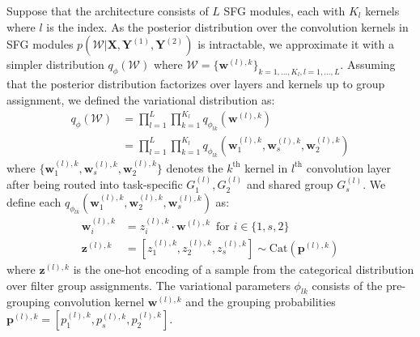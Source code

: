 Suppose that the architecture consists of $L$ SFG modules, each with $K_l$ kernels where $l$ is the index. As the posterior distribution over the convolution kernels in SFG modules $p(\mathcal{W}|\textbf{X}, \mathbf{Y}^{(1)}, \mathbf{Y}^{(2)})$ is intractable, we approximate it with a simpler distribution $q_{\phi}(\mathcal{W})$ where $\mathcal{W}=\{\mathbf{w}^{(l),k}\}_{k=1,...,K_{l},l=1,...,L}$. Assuming that the posterior distribution factorizes over layers and kernels up to group assignment, we defined the variational distribution as:
\begin{align*}
 q_{\phi}(\mathcal{W}) &= \prod_{l=1}^{L}\prod_{k=1}^{K_{l}} q_{\phi_{lk}}(\mathbf{w}^{(l),k}) \\
 &= \prod_{l=1}^{L}\prod_{k=1}^{K_{l}} q_{\phi_{lk}}(\mathbf{w}^{(l),k}_1,\mathbf{w}^{(l),k}_{s}, \mathbf{w}^{(l),k}_{2})
\end{align*}
where $\{\mathbf{w}^{(l),k}_1,\mathbf{w}^{(l),k}_{s}, \mathbf{w}^{(l),k}_{2}\}$ denotes the $k^{\text{th}}$ kernel in $l^{\text{th}}$ convolution layer after being routed into task-specific $G^{(l)}_1, G^{(l)}_2$ and shared group $G^{(l)}_{s}$. We define each $q_{\phi_{lk}}(\mathbf{w}^{(l),k}_1,\mathbf{w}^{(l),k}_2, \mathbf{w}^{(l),k}_{s})$ as: 
\begin{align}
\mathbf{w}^{(l),k}_{i} &= z^{(l),k}_{i}\cdot\mathbf{w}^{(l),k}\, \,\,\text{for } i \in\{1,s,2\}\\
\mathbf{z}^{(l),k}&=[z^{(l),k}_{1}, z^{(l),k}_{2},  z^{(l),k}_{s}] \sim \text{Cat}(\mathbf{p}^{(l),k}) \label{eq:sample_cat}
\end{align}
where $\mathbf{z}^{(l),k}$ is the one-hot encoding of a sample from the categorical distribution over filter group assignments. The variational parameters $\phi_{lk}$ consists of the pre-grouping convolution kernel $\mathbf{w}^{(l),k}$ and the grouping probabilities $\mathbf{p}^{(l),k}=[p^{(l),k}_1, p^{(l),k}_{s}, p^{(l),k}_2]$. 

